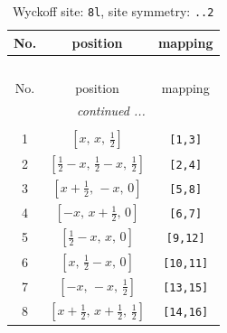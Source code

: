 \documentclass[fleqn,8pt]{jsarticle}
\begin{document}
\begin{longtable}{ccc}
\caption{Wyckoff site: {\tt 8l}, site symmetry: {\tt ..2}}
 \\
 \hline \hline
No. & position & mapping \\ \hline \endfirsthead

\multicolumn{2}{l}{\tablename\ \thetable{}} \\
 \hline \hline
No. & position & mapping \\ \hline \endhead

 \hline \hline
\multicolumn{2}{r}{\footnotesize\it continued ...} \\ \endfoot

 \hline \hline
\multicolumn{2}{r}{} \\ \endlastfoot

1 & $\left[ x,\, x,\, \frac{1}{2} \right]$ & {\tt [1,3]} \\ \hline
2 & $\left[ \frac{1}{2} - x,\, \frac{1}{2} - x,\, \frac{1}{2} \right]$ & {\tt [2,4]} \\ \hline
3 & $\left[ x + \frac{1}{2},\, - x,\, 0 \right]$ & {\tt [5,8]} \\ \hline
4 & $\left[ - x,\, x + \frac{1}{2},\, 0 \right]$ & {\tt [6,7]} \\ \hline
5 & $\left[ \frac{1}{2} - x,\, x,\, 0 \right]$ & {\tt [9,12]} \\ \hline
6 & $\left[ x,\, \frac{1}{2} - x,\, 0 \right]$ & {\tt [10,11]} \\ \hline
7 & $\left[ - x,\, - x,\, \frac{1}{2} \right]$ & {\tt [13,15]} \\ \hline
8 & $\left[ x + \frac{1}{2},\, x + \frac{1}{2},\, \frac{1}{2} \right]$ & {\tt [14,16]} \\
\end{longtable}
\renewcommand{\arraystretch}{1.2}
\end{document}
